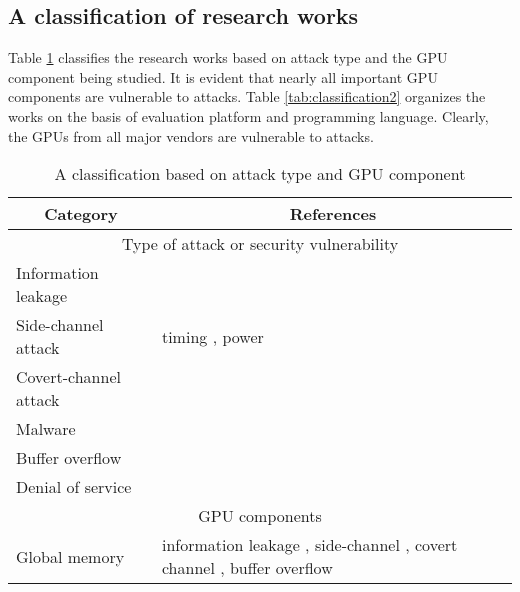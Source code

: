 \subsection{A classification of research works}\label{sec:classification}
 
Table \ref{tab:classification1} classifies the research works based on attack type and the GPU component being studied. It is evident that nearly all important GPU components are vulnerable to attacks. Table \ref{tab:classification2} organizes the works on the basis of evaluation platform and programming language. Clearly, the GPUs from all major vendors are vulnerable to attacks. 


\begin{table}[htbp]
\centering
\caption{A classification based on attack type and GPU component}
\label{tab:classification1}
\begin{tabular}{|p{3.0cm}|p{13cm}|}\hline
\multicolumn{1}{|c}{Category}   & \multicolumn{1}{|c|}{References} \\\hline\hline
\multicolumn{2}{|c|}{Type of attack or security vulnerability}   \\\hline
Information leakage &  \cite{patterson2013vulnerability,maurice2014confidentiality,bellekens2016strategies,pietro2016cuda,jiang2017novel,jiang2016complete,zhou2017vulnerable} \\\hline
Side-channel attack & timing  \cite{jiang2017novel,kadam2018rcoal,jiang2016complete}, power \cite{luo2015side} \\\hline
Covert-channel attack & \cite{naghibijouybari2017constructing} \\\hline
Malware &  \cite{vasiliadis2015gpu,zhu2017understanding,hayes2017gpu,ladakis2013you,naghibijouybari2017constructing} \\\hline
Buffer overflow &  \cite{miele2016buffer,erb2017dynamic,di2016study} \\\hline
Denial of service &  \cite{patterson2013vulnerability,balzarotti2015impact} \\\hline

\multicolumn{2}{|c|}{GPU components}   \\\hline
Global memory & information leakage  \cite{pietro2016cuda,maurice2014confidentiality,lombardisecure,lee2014stealing,hayes2017gpu,zhang2015forensically,bellekens2015data},  side-channel  \cite{jiang2016complete,kadam2018rcoal}, covert channel \cite{naghibijouybari2017constructing}, buffer overflow \cite{erb2017dynamic,di2016study} \\\hline


\end{tabular}
\end{table}

